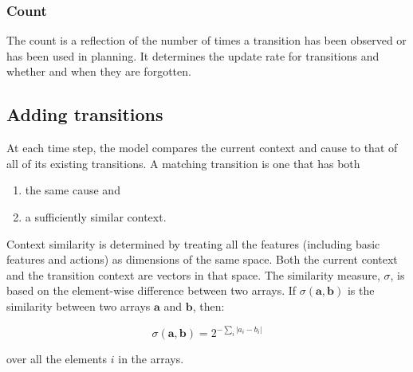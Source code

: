 \subsubsection{Count}
The count is a reflection of the number of times a transition has been observed or has been used in planning. It determines the update rate for transitions and whether and when they are forgotten.

\subsection{Adding transitions}
At each time step, the model compares the current context and cause to that of all of its existing transitions.
A matching transition is one that has both 
\begin{enumerate}
\item the same cause and 
\item a sufficiently similar context.
\end{enumerate}

Context similarity is determined by treating all the features (including basic features and actions) as dimensions of the same space. Both the current context and the transition context are vectors in that space. 
The similarity measure, $\sigma$, is based on the element-wise difference between two arrays. If $\sigma(\mathbf{a},\mathbf{b})$ is the similarity between two arrays $\mathbf{a}$ and $\mathbf{b}$, then:

\begin{equation}
\sigma(\mathbf{a},\mathbf{b}) = 2^{-\sum\limits_i |a_i - b_i|} 
\label{similarity_simple}
\end{equation}

over all the elements $i$ in the arrays.


